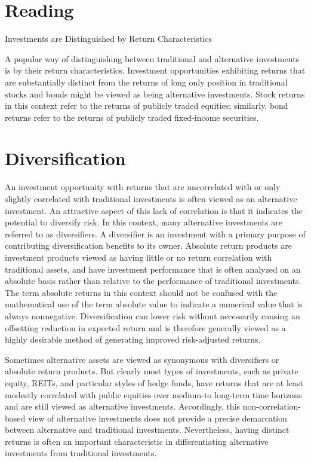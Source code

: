 \documentclass[11pt]{article}
\begin{document}
\section*{Reading}
Investments are Distinguished by Return Characteristics

A popular way of distinguishing between traditional and alternative investments is by their return characteristics. Investment opportunities exhibiting returns that are substantially distinct from the returns of long only position in traditional stocks and bonds might be viewed as being alternative investments. Stock returns in this context refer to the returns of publicly traded equities; similarly, bond returns refer to the returns of publicly traded fixed-income securities.

\section*{Diversification}
An investment opportunity with returns that are uncorrelated with or only slightly correlated with traditional investments is often viewed as an alternative investment. An attractive aspect of this lack of correlation is that it indicates the potential to diversify risk. In this context, many alternative investments are referred to as diversifiers. A diversifier is an investment with a primary purpose of contributing diversification benefits to its owner. Absolute return products are investment products viewed as having little or no return correlation with traditional assets, and have investment performance that is often analyzed on an absolute basis rather than relative to the performance of traditional investments. The term absolute returns in this context should not be confused with the mathematical use of the term absolute value to indicate a numerical value that is always nonnegative. Diversification can lower risk without necessarily causing an offsetting reduction in expected return and is therefore generally viewed as a highly desirable method of generating improved risk-adjusted returns.

Sometimes alternative assets are viewed as synonymous with diversifiers or absolute return products. But clearly most types of investments, such as private equity, REITs, and particular styles of hedge funds, have returns that are at least modestly correlated with public equities over medium-to long-term time horizons and are still viewed as alternative investments. Accordingly, this non-correlation-based view of alternative investments does not provide a precise demarcation between alternative and traditional investments. Nevertheless, having distinct returns is often an important characteristic in differentiating alternative investments from traditional investments.
\end{document}

